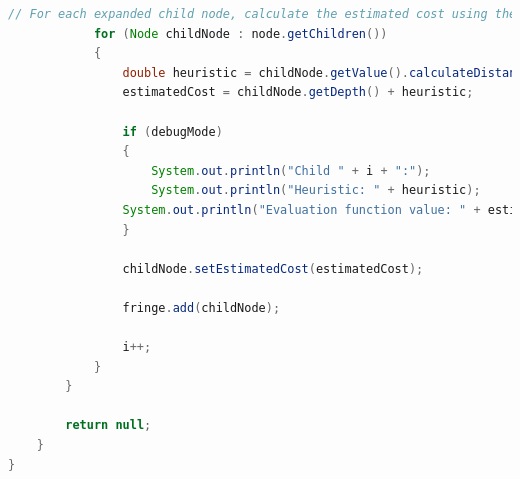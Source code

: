 \documentclass{article}
\begin{document}
\begin{appendices}
\begin{lstlisting}[language=Java]
			// For each expanded child node, calculate the estimated cost using the current depth and Manhattan distance (heuristic), and put it into the PriorityQueue.
			for (Node childNode : node.getChildren())
			{
				double heuristic = childNode.getValue().calculateDistance(solutionState);
				estimatedCost = childNode.getDepth() + heuristic;
			
				if (debugMode)
				{
					System.out.println("Child " + i + ":");
					System.out.println("Heuristic: " + heuristic);
				System.out.println("Evaluation function value: " + estimatedCost + "\n");
				}
			
				childNode.setEstimatedCost(estimatedCost);
			
				fringe.add(childNode);
			
				i++;
			}
		}
	
		return null;
	}
}
\end{lstlisting}
		
	\end{appendices}
	
\end{document}
